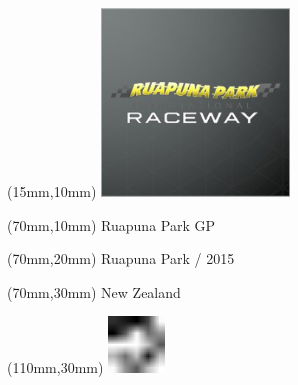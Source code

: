 \null\newpage
\begin{textblock*}{50mm}(15mm,10mm)%
\includegraphics[width=50mm]{LG/RUPU.png}
\end{textblock*}
\begin{textblock*}{130mm}(70mm,10mm)%
{\fontsize{20}{20}\selectfont Ruapuna Park GP}\\
\end{textblock*}
\begin{textblock*}{120mm}(70mm,20mm)%
{\fontsize{16}{16}\selectfont Ruapuna Park / 2015}\\
\end{textblock*}
\begin{textblock*}{120mm}(70mm,30mm)%
{\fontsize{12}{12}\selectfont New Zealand}
\end{textblock*}
\begin{textblock*}{30mm}(110mm,30mm)%
\centering
\includegraphics[height=15mm]{icons/fa-rotate-left.pdf}
\end{textblock*}
